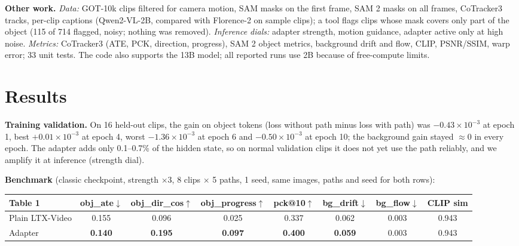 \documentclass[9pt,a4paper]{extarticle}
\begin{document}
\textbf{Other work.} \emph{Data:} GOT-10k clips filtered for camera motion, SAM masks on the first frame, SAM 2 masks on all frames, CoTracker3 tracks, per-clip captions (Qwen2-VL-2B, compared with Florence-2 on sample clips); a tool flags clips whose mask covers only part of the object (115 of 714 flagged, noisy; nothing was removed). \emph{Inference dials:} adapter strength, motion guidance, adapter active only at high noise. \emph{Metrics:} CoTracker3 (ATE, PCK, direction, progress), SAM 2 object metrics, background drift and flow, CLIP, PSNR/SSIM, warp error; 33 unit tests. The code also supports the 13B model; all reported runs use 2B because of free-compute limits.

\section{Results}
\textbf{Training validation.} On 16 held-out clips, the gain on object tokens (loss without path minus loss with path) was $-0.43{\times}10^{-3}$ at epoch 1, best $+0.01{\times}10^{-3}$ at epoch 4, worst $-1.36{\times}10^{-3}$ at epoch 6 and $-0.50{\times}10^{-3}$ at epoch 10; the background gain stayed $\approx 0$ in every epoch. The adapter adds only 0.1--0.7\% of the hidden state, so on normal validation clips it does not yet use the path reliably, and we amplify it at inference (strength dial).

\textbf{Benchmark} (classic checkpoint, strength $\times3$, 8 clips $\times$ 5 paths, 1 seed, same images, paths and seed for both rows):
\begin{center}\small
\begin{tabular}{@{}lccccccc@{}}
\toprule
Table 1 & obj\_ate$\downarrow$ & obj\_dir\_cos$\uparrow$ & obj\_progress$\uparrow$ & pck@10$\uparrow$ & bg\_drift$\downarrow$ & bg\_flow$\downarrow$ & CLIP sim\\
\midrule
Plain LTX-Video & 0.155 & 0.096 & 0.025 & 0.337 & 0.062 & 0.003 & 0.943\\
Adapter & \textbf{0.140} & \textbf{0.195} & \textbf{0.097} & \textbf{0.400} & \textbf{0.059} & 0.003 & 0.943\\
\bottomrule
\end{tabular}
\end{center}
\end{document}
